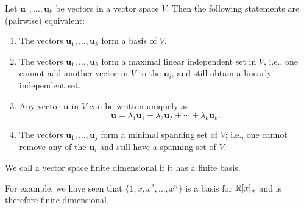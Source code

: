 \documentclass[10pt, a4paper]{article}
\newcommand{\mbf}[1]{\mathbf{#1}}
\begin{document}
\begin{theorem}
    Let $\mbf{u}_1, \dotsc, \mbf{u}_k$ be vectors in a vector space $V$.
    Then the following statements are
    (pairwise)
    equivalent:
    \begin{enumerate}[label = (\roman*)]
        \item The vectors $\mbf{u}_1, \dotsc, \mbf{u}_k$ form a basis of $V$.
        \item The vectors $\mbf{u}_1, \dotsc, \mbf{u}_k$ form a maximal linear independent set in $V$,
        i.e., one cannot add another vector in $V$ to the $\mbf{u}_i$,
        and still obtain a linearly independent set.
        \item Any vector $\mbf{u}$ in $V$ can be written uniquely as
        \[
        \mbf{u} = \lambda_1\mbf{u}_1 + \lambda_2\mbf{u}_2 + \dotsi + \lambda_k\mbf{u}_k.
        \]
        \item The vectors $\mbf{u}_1, \dotsc, \mbf{u}_j$ form a minimal spanning set of $V$;
        i.e., one cannot remove any of the $\mbf{u}_i$ and still have a spanning set of $V$.
    \end{enumerate}
\end{theorem}

We call a vector space finite dimensional if it has a finite basis.

For example,
we have seen that $\{1, x, x ^ 2, \dotsc, x ^ n\}$ is a basis for $\mathbb{R}[x]_n$ and is therefore finite dimensional.
\end{document}
